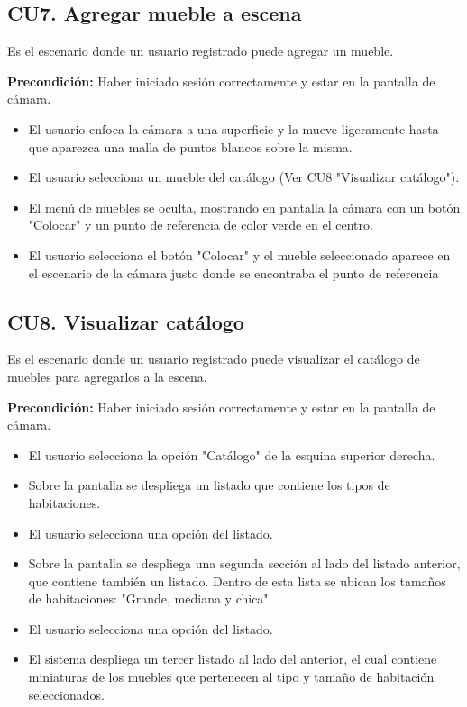 \subsection{CU7. Agregar mueble a escena}\par
Es el escenario donde un usuario registrado puede agregar un mueble.\par
\textbf{Precondición:} Haber iniciado sesión correctamente y estar en la pantalla de cámara.\par
\begin{itemize}
	\item El usuario enfoca la cámara a una superficie y la mueve ligeramente hasta que aparezca una malla de puntos blancos sobre la misma.
	\item El usuario selecciona un mueble del catálogo (Ver CU8 "Visualizar catálogo").
	\item El menú de muebles se oculta, mostrando en pantalla la cámara con un botón "Colocar" y un punto de referencia de color verde en el centro.
	\item El usuario selecciona el botón "Colocar" y el mueble seleccionado aparece en el escenario de la cámara justo donde se encontraba el punto de referencia
\end{itemize}

\subsection{CU8. Visualizar catálogo}\par
Es el escenario donde un usuario registrado puede visualizar el catálogo de muebles para agregarlos a la escena.\par
\textbf{Precondición:} Haber iniciado sesión correctamente y estar en la pantalla de cámara.\par
\begin{itemize}
	\item El usuario selecciona la opción "Catálogo" de la esquina superior derecha.
	\item Sobre la pantalla se despliega un listado que contiene los tipos de habitaciones.
	\item El usuario selecciona una opción del listado.
	\item Sobre la pantalla se despliega una segunda sección al lado del listado anterior, que contiene también un listado. Dentro de esta lista se ubican los tamaños de habitaciones: "Grande, mediana y chica".
	\item El usuario selecciona una opción del listado.
	\item El sistema despliega un tercer listado al lado del anterior, el cual contiene miniaturas de los muebles que pertenecen al tipo y tamaño de habitación seleccionados.
\end{itemize}

